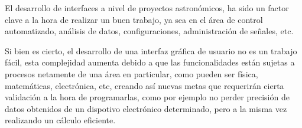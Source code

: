 El desarrollo de interfaces a nivel de proyectos astronómicos,
ha sido un factor clave a la hora de realizar un buen trabajo,
ya sea en el área de control automatizado, análisis de datos,
configuraciones, administración de señales, etc.

Si bien es cierto, el desarrollo de una interfaz gráfica de usuario
no es un trabajo fácil, esta  complejidad aumenta debido a que las
funcionalidades están sujetas a procesos netamente de una área
en particular, como pueden ser física, matemáticas, electrónica,
etc, creando así nuevas metas que requerirán cierta validación
a la hora de programarlas, como por ejemplo no perder precisión
de datos obtenidos de un dispotivo electrónico determinado,
pero a la misma vez realizando un cálculo eficiente.
